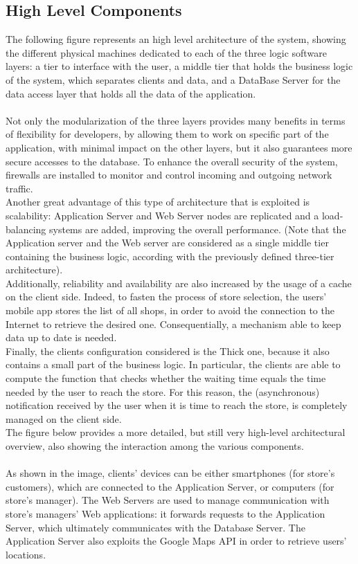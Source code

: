 \documentclass{article}
\begin{document}
\subsection{High Level Components}
The following figure represents an high level architecture of the system, showing the different physical machines dedicated to each of the three logic software layers: a tier to interface with the user, a middle tier that holds the business logic of the system, which separates clients and data, and a DataBase Server for the data access layer that holds all the data of the application. \\
\smallskip\\
Not only the modularization of the three layers provides many benefits in terms of flexibility for developers, by allowing them to work on specific part of the application, with minimal impact on the other layers, but it also guarantees more secure accesses to the database. To enhance the overall security of the system, firewalls are installed to monitor and control incoming and outgoing network traffic.
\smallskip\\
Another great advantage of this type of architecture that is exploited is scalability: Application Server and Web Server nodes are replicated and a load-balancing systems are added, improving the overall performance. (Note that the Application server and the Web server are considered as a single middle tier containing the business logic, according with the previously defined three-tier architecture).
\smallskip\\
Additionally, reliability and availability are also increased by the usage of a cache on the client side. Indeed, to fasten the process of store selection, the users’ mobile app stores the list of all shops, in order to avoid the connection to the Internet to retrieve the desired one. Consequentially, a mechanism able to keep data up to date is needed.
\smallskip\\
Finally, the clients configuration considered is the Thick one, because it also contains a small part of the business logic. In particular, the clients are able to compute the function that checks whether the waiting time equals the time needed by the user to reach the store. For this reason, the (asynchronous) notification received by the user when it is time to reach the store, is completely managed on the client side.
\smallskip\\
The figure below provides a more detailed, but still very high-level architectural overview, also showing the interaction among the various components.\\
\smallskip\\
As shown in the image, clients’ devices can be either smartphones (for store’s customers), which are connected to the Application Server, or computers (for store’s manager). The Web Servers are used to manage communication with store’s managers’ Web applications: it forwards requests to the Application Server, which ultimately communicates with the Database Server. The Application Server also exploits the Google Maps API in order to retrieve users’ locations.
\end{document}
